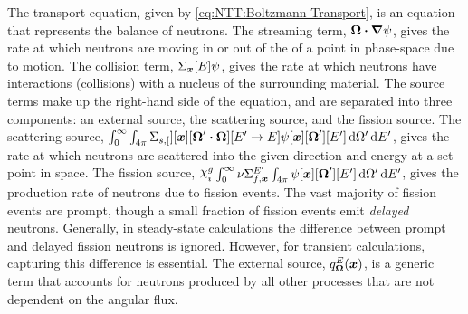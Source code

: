 {{    The transport equation, given by \cref{eq:NTT:Boltzmann Transport}, is an equation that represents the balance of neutrons.
    The streaming term, $\boldsymbol{\Omega}\boldsymbol{\cdot}\boldsymbol{\nabla}\psi$, gives the rate at which neutrons are moving in or out of the of a point in phase-space due to motion.
    The collision term, $\xst[\loc][E]\aflux$, gives the rate at which neutrons have interactions (collisions) with a nucleus of the surrounding material.
    The source terms make up the right-hand side of the equation, and are separated into three components: an external source, the scattering source, and the fission source.
    The scattering source, $\intl[0][\infty]\intl[\fourpi]\xss[][\loc][\dirprime\vdot\dir][\Eprime\to E]\aflux[\loc][\dirprime][\Eprime]\ddirprime\dif{\Eprime}$, gives the rate at which neutrons are scattered into the given direction and energy at a set point in space.
    The fission source, $\spect\intl[0][\infty]\nufis[\loc][\Eprime]\intl[\fourpi]\aflux[\loc][\dirprime][\Eprime]\ddirprime\dif{\Eprime}$, gives the production rate of neutrons due to fission events.
    The vast majority of fission events are prompt, though a small fraction of fission events emit \emph{delayed} neutrons.
    Generally, in steady-state calculations the difference between prompt and delayed fission neutrons is ignored.
    However, for transient calculations, capturing this difference is essential.
    The external source, $\source[\loc][\dir][E]$, is a generic term that accounts for neutrons produced by all other processes that are not dependent on the angular flux.

}}
